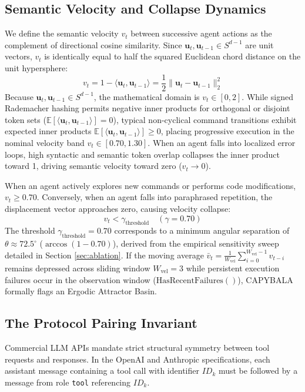 \documentclass[journal]{IEEEtran}
\begin{document}
\subsection{Semantic Velocity and Collapse Dynamics}
We define the semantic velocity $v_t$ between successive agent actions as the complement of directional cosine similarity. Since $\mathbf{u}_t, \mathbf{u}_{t-1} \in S^{d-1}$ are unit vectors, $v_t$ is identically equal to half the squared Euclidean chord distance on the unit hypersphere:
\begin{equation}
v_t = 1 - \langle \mathbf{u}_t, \mathbf{u}_{t-1} \rangle = \frac{1}{2} \|\mathbf{u}_t - \mathbf{u}_{t-1}\|_2^2
\end{equation}
Because $\mathbf{u}_t, \mathbf{u}_{t-1} \in S^{d-1}$, the mathematical domain is $v_t \in [0, 2]$. While signed Rademacher hashing permits negative inner products for orthogonal or disjoint token sets ($\mathbb{E}[\langle \mathbf{u}_t, \mathbf{u}_{t-1} \rangle] = 0$), typical non-cyclical command transitions exhibit expected inner products $\mathbb{E}[\langle \mathbf{u}_t, \mathbf{u}_{t-1} \rangle] \ge 0$, placing progressive execution in the nominal velocity band $v_t \in [0.70, 1.30]$. When an agent falls into localized error loops, high syntactic and semantic token overlap collapses the inner product toward 1, driving semantic velocity toward zero ($v_t \to 0$).

When an agent actively explores new commands or performs code modifications, $v_t \ge 0.70$. Conversely, when an agent falls into paraphrased repetition, the displacement vector approaches zero, causing velocity collapse:
\begin{equation}
v_t < \gamma_{\text{threshold}} \quad (\gamma = 0.70)
\end{equation}
The threshold $\gamma_{\text{threshold}} = 0.70$ corresponds to a minimum angular separation of $\theta \approx 72.5^\circ$ ($\arccos(1 - 0.70)$), derived from the empirical sensitivity sweep detailed in Section \ref{sec:ablation}. If the moving average $\bar{v}_t = \frac{1}{W_{\text{vel}}} \sum_{i=0}^{W_{\text{vel}}-1} v_{t-i}$ remains depressed across sliding window $W_{\text{vel}} = 3$ while persistent execution failures occur in the observation window ($\text{HasRecentFailures}()$), CAPYBALA formally flags an Ergodic Attractor Basin.

\subsection{The Protocol Pairing Invariant}
Commercial LLM APIs mandate strict structural symmetry between tool requests and responses. In the OpenAI and Anthropic specifications, each assistant message containing a tool call with identifier $ID_k$ must be followed by a message from role \texttt{tool} referencing $ID_k$.
\end{document}
